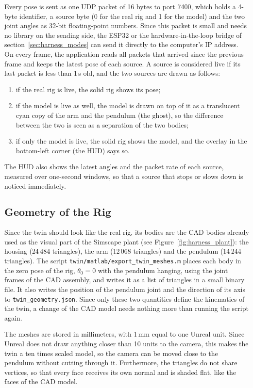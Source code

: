 \documentclass[a4paper,11pt]{article}
\begin{document}
Every pose is sent as one UDP packet of 16 bytes to port 7400, which holds a 4-byte identifier, a source byte (0 for the real rig and 1 for the model) and the two joint angles as 32-bit floating-point numbers. Since this packet is small and needs no library on the sending side, the ESP32 or the hardware-in-the-loop bridge of section~\ref{sec:harness_modes} can send it directly to the computer's IP address. On every frame, the application reads all packets that arrived since the previous frame and keeps the latest pose of each source. A source is considered live if its last packet is less than 1\,s old, and the two sources are drawn as follows:
\begin{enumerate}
  \item if the real rig is live, the solid rig shows its pose;
  \item if the model is live as well, the model is drawn on top of it as a translucent cyan copy of the arm and the pendulum (the ghost), so the difference between the two is seen as a separation of the two bodies;
  \item if only the model is live, the solid rig shows the model, and the overlay in the bottom-left corner (the HUD) says so.
\end{enumerate}
The HUD also shows the latest angles and the packet rate of each source, measured over one-second windows, so that a source that stops or slows down is noticed immediately.

\subsection{Geometry of the Rig}
\label{sec:twin_geometry}
Since the twin should look like the real rig, its bodies are the CAD bodies already used as the visual part of the Simscape plant (see Figure~\ref{fig:harness_plant}): the housing (24\,484 triangles), the arm (12\,068 triangles) and the pendulum (14\,244 triangles). The script \nolinkurl{twin/matlab/export_twin_meshes.m} places each body in the zero pose of the rig, $\theta_0 = 0$ with the pendulum hanging, using the joint frames of the CAD assembly, and writes it as a list of triangles in a small binary file. It also writes the position of the pendulum joint and the direction of its axis to \texttt{twin\_geometry.json}. Since only these two quantities define the kinematics of the twin, a change of the CAD model needs nothing more than running the script again.

The meshes are stored in millimeters, with 1\,mm equal to one Unreal unit. Since Unreal does not draw anything closer than 10 units to the camera, this makes the twin a ten times scaled model, so the camera can be moved close to the pendulum without cutting through it. Furthermore, the triangles do not share vertices, so that every face receives its own normal and is shaded flat, like the faces of the CAD model.
\end{document}
